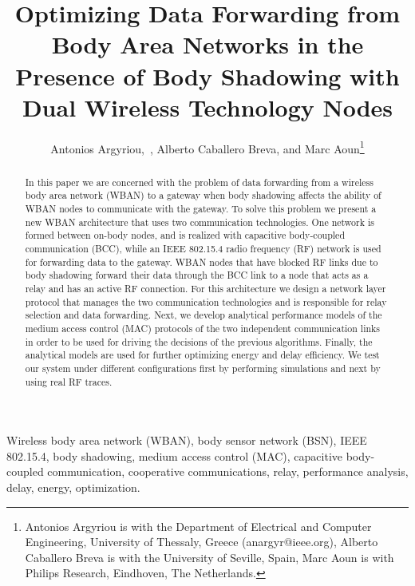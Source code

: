 \documentclass[10pt]{IEEEtran}
\begin{document}
\title{Optimizing Data Forwarding from Body Area Networks in the Presence of Body Shadowing with Dual Wireless Technology Nodes}

\author{Antonios Argyriou,~, Alberto Caballero Breva, and Marc Aoun\thanks{Antonios Argyriou is with the Department of Electrical and Computer Engineering, University of Thessaly, Greece (anargyr@ieee.org), Alberto Caballero Breva is with the University of Seville, Spain, Marc Aoun is with Philips Research, Eindhoven, The Netherlands.}
 \vspace{-6mm} }

\maketitle





\begin{abstract}
In this paper we are concerned with the problem of data forwarding from a wireless body area network (WBAN) to a gateway when body shadowing affects the ability of WBAN nodes to communicate with the gateway. To solve this problem we present a new WBAN architecture that uses two communication technologies. One network is formed between on-body nodes, and is realized with capacitive body-coupled communication (BCC), while an IEEE 802.15.4 radio frequency (RF) network is used for forwarding data to the gateway. WBAN nodes that have blocked RF links due to body shadowing forward their data through the BCC link to a node that acts as a relay and has an active RF connection. For this architecture we design a network layer protocol that manages the two communication technologies and is responsible for relay selection and data forwarding. Next, we develop analytical performance models of the medium access control (MAC) protocols of the two independent communication links in order to be used for driving the decisions of the previous algorithms. Finally, the analytical models are used for further optimizing energy and delay efficiency. We test our system under different configurations first by performing simulations and next by using real RF traces.
\end{abstract}

\begin{IEEEkeywords}
Wireless body area network (WBAN), body sensor network (BSN), IEEE 802.15.4, body shadowing, medium access control (MAC), capacitive body-coupled communication, cooperative communications, relay, performance analysis, delay, energy, optimization.
\end{IEEEkeywords}
\end{document}
